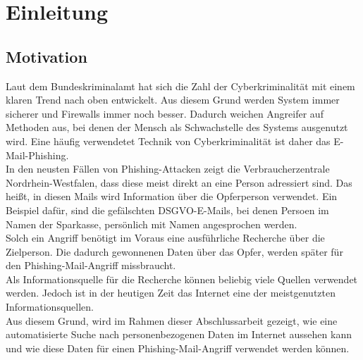 \chapter{Einleitung}
\label{cha:einleitung}


\section{Motivation}
\label {sec:Motivation}
Laut dem Bundeskriminalamt hat sich die Zahl der Cyberkriminalität mit einem klaren Trend nach oben entwickelt. \cite{Cyberkriminalitaet} Aus diesem Grund werden System immer sicherer und Firewalls immer noch besser. Dadurch weichen Angreifer auf Methoden aus, bei denen der Mensch als Schwachstelle des Systems ausgenutzt wird. Eine häufig verwendetet Technik von Cyberkriminalität ist daher das E-Mail-Phishing.\\
In den neusten Fällen von Phishing-Attacken zeigt die Verbraucherzentrale Nordrhein-Westfalen, dass diese meist direkt an eine Person adressiert sind. Das heißt, in diesen Mails wird Information über die Opferperson verwendet. Ein Beispiel dafür, sind die gefälschten DSGVO-E-Mails, bei denen Persoen im Namen der Sparkasse, persönlich mit Namen angesprochen werden. \cite{VerbraucherzentraleNW} \\
Solch ein Angriff benötigt im Voraus eine ausführliche Recherche über die Zielperson. Die dadurch gewonnenen Daten über das Opfer, werden später für den Phishing-Mail-Angriff missbraucht.\\
Als Informationsquelle für die Recherche können beliebig viele Quellen verwendet werden. Jedoch ist in der heutigen Zeit das Internet eine der meistgenutzten Informationsquellen.\cite{Inforamtionsquellen}\\
Aus diesem Grund, wird im Rahmen dieser Abschlussarbeit gezeigt, wie eine automatisierte Suche nach personenbezogenen Daten im Internet aussehen kann und wie diese Daten für einen Phishing-Mail-Angriff verwendet werden können. 

